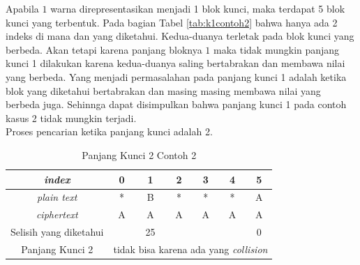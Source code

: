 	Apabila $1$ warna direpresentasikan menjadi 1 blok kunci, maka terdapat 5 blok kunci yang terbentuk. Pada bagian Tabel \ref{tab:k1contoh2} bahwa hanya ada 2 indeks di mana \plaintext dan \ciphertext yang diketahui. Kedua-duanya terletak pada blok kunci yang berbeda. Akan tetapi karena panjang bloknya $1$ maka tidak mungkin panjang kunci 1 dilakukan karena kedua-duanya saling bertabrakan dan membawa nilai yang berbeda. Yang menjadi permasalahan pada panjang kunci 1 adalah ketika blok yang diketahui bertabrakan dan masing masing membawa nilai yang berbeda juga. Sehinnga dapat disimpulkan bahwa panjang kunci 1 pada contoh kasus 2 tidak mungkin terjadi.
	\\
	Proses pencarian ketika panjang kunci adalah 2.
	\begin{table}[H]
	 	\centering
	 	\caption{Panjang Kunci 2 Contoh 2}
	 	\setlength{\arrayrulewidth}{.08em}
	 	\begin{tabular}{|c|c|c|c|c|c|c|}\hline
		\textit{index}&0&1&2&3&4&5\\ \hline
	 	\textit{plain text}&\cellcolor{blue!15}*&\cellcolor{blue!15}B&\cellcolor{green!15}*&\cellcolor{green!15}*&\cellcolor{pink!30}*&\cellcolor{pink!30}A\\ \hline
	 	\textit{ciphertext}&\cellcolor{blue!15}A&\cellcolor{blue!15}A&\cellcolor{green!15}A&\cellcolor{green!15}A&\cellcolor{pink!30}A&\cellcolor{pink!30}A\\ \hline
	 	Selisih yang diketahui& &25& & & &0\\ \hline
	 	Panjang Kunci 2 & \multicolumn{6}{c|}{tidak bisa karena ada yang \textit{collision}}\\ \hline
	 	\end{tabular}
	 	\label{tab:k2contoh2}
	\end{table}	
	
